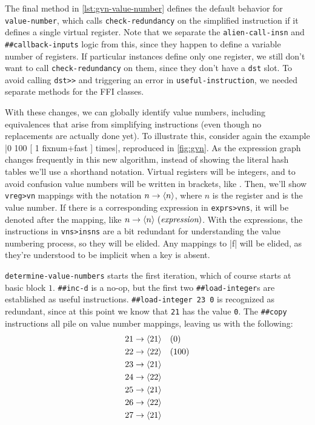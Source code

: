 The final method in \vref{lst:gvn-value-number} defines the default behavior
for \Verb|value-number|, which calls \Verb|check-redundancy| on the
simplified instruction if it defines a single virtual register.  Note that we
separate the \Verb|alien-call-insn| and \Verb|##callback-inputs| logic from
this, since they happen to define a variable number of registers.  If
particular instances define only one register, we still don't want to call
\Verb|check-redundancy| on them, since they don't have a \Verb|dst| slot.
To avoid calling \Verb|dst>>| and triggering an error in
\Verb|useful-instruction|, we needed separate methods for the \gls{FFI}
classes.


With these changes, we can globally identify value numbers, including
equivalences that arise from simplifying instructions (even though no
replacements are actually done yet).  To illustrate this, consider again the
example
%
\factor|0 100 [ 1 fixnum+fast ] times|,
%
reproduced in \vref{fig:gvn}.  As the expression graph changes frequently in
this new algorithm, instead of showing the literal hash tables we'll use a
shorthand notation.  Virtual registers will be integers, and to avoid confusion
value numbers will be written in brackets, like .  Then, we'll show
\Verb|vreg>vn| mappings with the notation $n\to\langle n\rangle$, where $n$ is the
register and  is the value number.  If there is a corresponding
expression in \Verb|exprs>vns|, it will be denoted after the mapping, like
$n\to\langle n\rangle~(\textit{expression})$.  With the expressions, the instructions in
\Verb|vns>insns| are a bit redundant for understanding the value numbering
process, so they will be elided.  Any mappings to \factor|f| will be elided, as
they're understood to be implicit when a key is absent.


\Verb|determine-value-numbers| starts the first iteration, which of course
starts at basic block $1$.  \Verb|##inc-d| is a no-op, but the first two
\Verb|##load-integer|s are established as useful instructions.
%
\Verb|##load-integer 23 0|
%
is recognized as redundant, since at this point we know that \Verb|21| has
the value \Verb|0|.  The \Verb|##copy| instructions all pile on value
number mappings, leaving us with the following:
%
\begin{align*}
  21 &\to \langle 21\rangle \quad (0)  \\
  22 &\to \langle 22\rangle \quad (100)\\
  23 &\to \langle 21\rangle            \\
  24 &\to \langle 22\rangle            \\
  25 &\to \langle 21\rangle            \\
  26 &\to \langle 22\rangle            \\
  27 &\to \langle 21\rangle
\end{align*}

